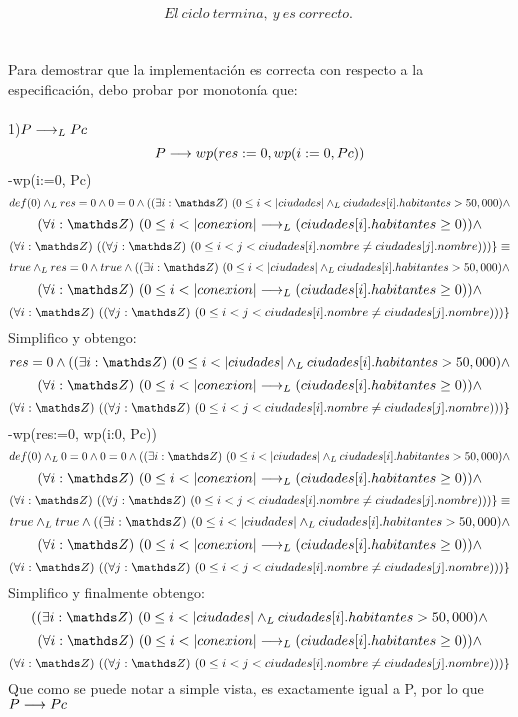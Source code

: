 \documentclass[10pt,a4paper]{article}
\begin{document}
\[El \ ciclo\ termina ,\ y\ es\ correcto.\ \]\\
\\
Para demostrar que la implementación es correcta con respecto a la especificación, debo probar por monotonía que:\\ \\
1)$ P\longrightarrow _L Pc$\\ \hspace{0.5cm}
\[P \longrightarrow wp(res:=0, wp(i:=0, Pc))\]
-wp(i:=0, Pc)
\[def(0) \yLuego  res = 0 \land 0 = 0 \land (\existe[unalinea]i\ent {0\leq i<|ciudades| \yLuego ciudades[i].habitantes > 50,000} \land \]  \[ \paraTodo[unalinea]i{\ent}{0 \leq i<|conexion|  \implicaLuego  (ciudades[i].habitantes \geq 0) } \land \] \[
    \paraTodo[unalinea]i{\ent}{\paraTodo[unalinea]j{\ent}{0 \leq i  < j<ciudades[i].nombre \neq ciudades[j].nombre}})\}  \equiv \]
\[true \yLuego  res = 0 \land true \land (\existe[unalinea]i\ent {0\leq i<|ciudades| \yLuego ciudades[i].habitantes > 50,000} \land \]  \[ \paraTodo[unalinea]i{\ent}{0 \leq i<|conexion|  \implicaLuego  (ciudades[i].habitantes \geq 0) } \land \] \[
    \paraTodo[unalinea]i{\ent}{\paraTodo[unalinea]j{\ent}{0 \leq i  < j<ciudades[i].nombre \neq ciudades[j].nombre}})\}  \]
Simplifico y obtengo:
\[  res = 0  \land (\existe[unalinea]i\ent {0\leq i<|ciudades| \yLuego ciudades[i].habitantes > 50,000} \land \]  \[ \paraTodo[unalinea]i{\ent}{0 \leq i<|conexion|  \implicaLuego  (ciudades[i].habitantes \geq 0) } \land \] \[
    \paraTodo[unalinea]i{\ent}{\paraTodo[unalinea]j{\ent}{0 \leq i  < j<ciudades[i].nombre \neq ciudades[j].nombre}})\}  \]
-wp(res:=0, wp(i:0, Pc))
\[def(0) \yLuego  0 = 0 \land 0 = 0 \land (\existe[unalinea]i\ent {0\leq i<|ciudades| \yLuego ciudades[i].habitantes > 50,000} \land \]  \[ \paraTodo[unalinea]i{\ent}{0 \leq i<|conexion|  \implicaLuego  (ciudades[i].habitantes \geq 0) } \land \] \[
    \paraTodo[unalinea]i{\ent}{\paraTodo[unalinea]j{\ent}{0 \leq i  < j<ciudades[i].nombre \neq ciudades[j].nombre}})\}  \equiv \]
\[true \yLuego  true  \land (\existe[unalinea]i\ent {0\leq i<|ciudades| \yLuego ciudades[i].habitantes > 50,000} \land \]  \[ \paraTodo[unalinea]i{\ent}{0 \leq i<|conexion|  \implicaLuego  (ciudades[i].habitantes \geq 0) } \land \] \[
    \paraTodo[unalinea]i{\ent}{\paraTodo[unalinea]j{\ent}{0 \leq i  < j<ciudades[i].nombre \neq ciudades[j].nombre}})\}  \]
Simplifico y finalmente obtengo:
\[(\existe[unalinea]i\ent {0\leq i<|ciudades| \yLuego ciudades[i].habitantes > 50,000} \land \]  \[ \paraTodo[unalinea]i{\ent}{0 \leq i<|conexion|  \implicaLuego  (ciudades[i].habitantes \geq 0) } \land \] \[
    \paraTodo[unalinea]i{\ent}{\paraTodo[unalinea]j{\ent}{0 \leq i  < j<ciudades[i].nombre \neq ciudades[j].nombre}})\}  \]
Que como se puede notar a simple vista, es exactamente igual a P, por lo que $P \longrightarrow Pc$  \\
\end{document}
